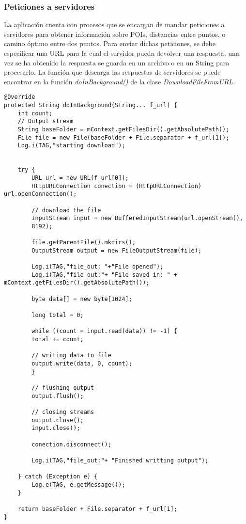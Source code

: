 \subsubsection{Peticiones a servidores}
La aplicación cuenta con procesos que se encargan de mandar peticiones a servidores para obtener información sobre POIs, distancias entre puntos, o camino óptimo entre dos puntos. Para enviar dichas peticiones, se debe especificar una URL para la cual el servidor pueda devolver una respuesta, una vez se ha obtenido la respuesta se guarda en un archivo o en un String para procesarlo. La función que descarga las respuestas de servidores se puede encontrar en la función \textit{doInBackground()} de la clase \textit{DownloadFileFromURL.}
\begin{lstlisting}[caption=Función para enviar peticiones a servidores y guardar respuesta.]
@Override
protected String doInBackground(String... f_url) {
	int count;
	// Output stream
	String baseFolder = mContext.getFilesDir().getAbsolutePath();
	File file = new File(baseFolder + File.separator + f_url[1]);
	Log.i(TAG,"starting download");
	
	
	try {
		URL url = new URL(f_url[0]);
		HttpURLConnection conection = (HttpURLConnection) url.openConnection();
		
		// download the file
		InputStream input = new BufferedInputStream(url.openStream(),
		8192);
		
		file.getParentFile().mkdirs();
		OutputStream output = new FileOutputStream(file);
		
		Log.i(TAG,"file_out: "+"File opened");
		Log.i(TAG,"file_out:"+ "File saved in: " + mContext.getFilesDir().getAbsolutePath());
		
		byte data[] = new byte[1024];
		
		long total = 0;
		
		while ((count = input.read(data)) != -1) {
		total += count;
		
		// writing data to file
		output.write(data, 0, count);
		}
		
		// flushing output
		output.flush();
		
		// closing streams
		output.close();
		input.close();
		
		conection.disconnect();
		
		Log.i(TAG,"file_out:"+ "Finished writting output");
	
	} catch (Exception e) {
		Log.e(TAG, e.getMessage());
	}
	
	return baseFolder + File.separator + f_url[1];
}
\end{lstlisting}

